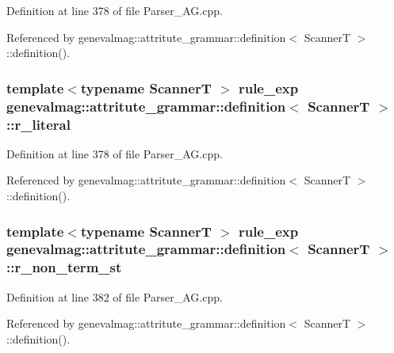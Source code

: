 Definition at line 378 of file Parser\_\-AG.cpp.



Referenced by genevalmag::attritute\_\-grammar::definition$<$ ScannerT $>$::definition().

\hypertarget{structgenevalmag_1_1attritute__grammar_1_1definition_a681c18f52b8ef949c068467ee956212a}{
\subsubsection[{r\_\-literal}]{\setlength{\rightskip}{0pt plus 5cm}template$<$typename ScannerT $>$ {\bf rule\_\-exp} {\bf genevalmag::attritute\_\-grammar::definition}$<$ ScannerT $>$::{\bf r\_\-literal}}}
\label{structgenevalmag_1_1attritute__grammar_1_1definition_a681c18f52b8ef949c068467ee956212a}


Definition at line 378 of file Parser\_\-AG.cpp.



Referenced by genevalmag::attritute\_\-grammar::definition$<$ ScannerT $>$::definition().

\hypertarget{structgenevalmag_1_1attritute__grammar_1_1definition_a35860aafa3d80d2dfa7655088a4950c9}{
\subsubsection[{r\_\-non\_\-term\_\-st}]{\setlength{\rightskip}{0pt plus 5cm}template$<$typename ScannerT $>$ {\bf rule\_\-exp} {\bf genevalmag::attritute\_\-grammar::definition}$<$ ScannerT $>$::{\bf r\_\-non\_\-term\_\-st}}}
\label{structgenevalmag_1_1attritute__grammar_1_1definition_a35860aafa3d80d2dfa7655088a4950c9}


Definition at line 382 of file Parser\_\-AG.cpp.



Referenced by genevalmag::attritute\_\-grammar::definition$<$ ScannerT $>$::definition().

